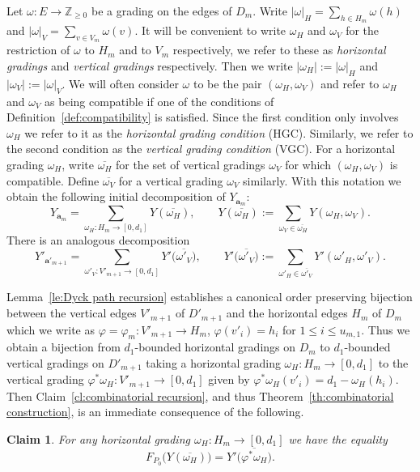 \documentclass{amsart}
\newtheorem{claim}[theorem]{Claim}
\newcommand{\bfa}{\mathbf{a}}
\newcommand{\ZZ}{\mathbb{Z}}
\begin{document}
Let $\omega:E\to\ZZ_{\ge0}$ be a grading on the edges of $D_m$.  Write $|\omega|_H=\sum\limits_{h\in H_m} \omega(h)$ and $|\omega|_V=\sum\limits_{v\in V_m} \omega(v)$.  It will be convenient to write $\omega_H$ and $\omega_V$ for the restriction of $\omega$ to $H_m$ and to $V_m$ respectively, we refer to these as \emph{horizontal gradings} and \emph{vertical gradings} respectively.  Then we write $|\omega_H|:=|\omega|_H$ and $|\omega_V|:=|\omega|_V$.  We will often consider $\omega$ to be the pair $(\omega_H,\omega_V)$ and refer to $\omega_H$ and $\omega_V$ as being compatible if one of the conditions of Definition~\ref{def:compatibility} is satisfied.  Since the first condition only involves $\omega_H$ we refer to it as the \emph{horizontal grading condition} (HGC).  Similarly, we refer to the second condition as the \emph{vertical grading condition} (VGC).  For a horizontal grading $\omega_H$, write $\overline{\omega_H}$ for the set of vertical gradings $\omega_V$ for which $(\omega_H,\omega_V)$ is compatible.  Define $\overline{\omega_V}$ for a vertical grading $\omega_V$ similarly.  With this notation we obtain the following initial decomposition of $Y_{\bfa_m}$:
\begin{equation}\label{eq:Y decomposition}
  Y_{\bfa_m}=\sum_{\omega_H:H_m\to[0,d_1]}Y(\overline{\omega_H}),\qquad Y(\overline{\omega_H}):=\sum_{\omega_V\in\overline{\omega_H}}Y(\omega_H,\omega_V).
\end{equation}
There is an analogous decomposition
\begin{equation}\label{eq:Y prime decomposition}
  Y'_{\bfa'_{m+1}}=\sum_{\omega'_V:V'_{m+1}\to[0,d_1]}Y'\Big(\overline{\omega'_V}\Big),\qquad Y'\Big(\overline{\omega'_V}\Big):=\sum_{\omega'_H\in\overline{\omega'_V}}Y'(\omega'_H,\omega'_V).
\end{equation}

Lemma~\ref{le:Dyck path recursion} establishes a canonical order preserving bijection between the vertical edges $V'_{m+1}$ of $D'_{m+1}$ and the horizontal edges $H_m$ of $D_m$ which we write as $\varphi=\varphi_m:V'_{m+1}\to H_m$, $\varphi(v'_i)=h_i$ for $1\le i\le u_{m,1}$.  Thus we obtain a bijection from $d_1$-bounded horizontal gradings on $D_m$ to $d_1$-bounded vertical gradings on $D'_{m+1}$ taking a horizontal grading $\omega_H:H_m\to[0,d_1]$ to the vertical grading $\varphi^*\omega_H:V'_{m+1}\to[0,d_1]$ given by $\varphi^*\omega_H(v'_i)=d_1-\omega_H(h_i)$.  Then Claim~\ref{cl:combinatorial recursion}, and thus Theorem~\ref{th:combinatorial construction}, is an immediate consequence of the following.
\begin{claim}\label{cl:horizontal to vertical}
  For any horizontal grading $\omega_H:H_m\to[0,d_1]$ we have the equality
  \begin{equation}\label{eq:horizontal to vertical}
    F_{P_0}\big(Y(\overline{\omega_H})\big)=Y'\big(\overline{\varphi^*\omega_H}\big).
  \end{equation}
\end{claim}
\end{document}
